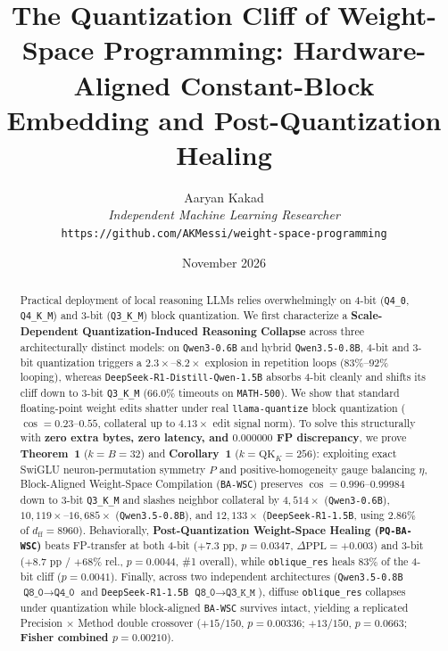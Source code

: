 \documentclass[11pt,letterpaper]{article}
\title{\textbf{The Quantization Cliff of Weight-Space Programming: Hardware-Aligned Constant-Block Embedding and Post-Quantization Healing}}
\author{Aaryan Kakad\\
\textit{Independent Machine Learning Researcher}\\
\texttt{https://github.com/AKMessi/weight-space-programming}}
\date{November 2026}
\begin{document}
\maketitle

\begin{abstract}
Practical deployment of local reasoning LLMs relies overwhelmingly on 4-bit (\texttt{Q4\_0}, \texttt{Q4\_K\_M}) and 3-bit (\texttt{Q3\_K\_M}) block quantization. We first characterize a \textbf{Scale-Dependent Quantization-Induced Reasoning Collapse} across three architecturally distinct models: on \texttt{Qwen3-0.6B} and hybrid \texttt{Qwen3.5-0.8B}, 4-bit and 3-bit quantization triggers a $2.3\times$--$8.2\times$ explosion in repetition loops ($83\%$--$92\%$ looping), whereas \texttt{DeepSeek-R1-Distill-Qwen-1.5B} absorbs 4-bit cleanly and shifts its cliff down to 3-bit \texttt{Q3\_K\_M} ($66.0\%$ timeouts on \texttt{MATH-500}). We show that standard floating-point weight edits shatter under real \texttt{llama-quantize} block quantization ($\cos = 0.23\text{--}0.55$, collateral up to $4.13\times$ edit signal norm). To solve this structurally with \textbf{zero extra bytes, zero latency, and $0.000000$ FP discrepancy}, we prove \textbf{Theorem~1} ($k=B=32$) and \textbf{Corollary~1} ($k=\mathrm{QK}_K=256$): exploiting exact SwiGLU neuron-permutation symmetry $P$ and positive-homogeneity gauge balancing $\eta$, Block-Aligned Weight-Space Compilation (\texttt{BA-WSC}) preserves $\cos = 0.996\text{--}0.99984$ down to 3-bit \texttt{Q3\_K\_M} and slashes neighbor collateral by $4{,}514\times$ (\texttt{Qwen3-0.6B}), $10{,}119\times\text{--}16{,}685\times$ (\texttt{Qwen3.5-0.8B}), and $12{,}133\times$ (\texttt{DeepSeek-R1-1.5B}, using $2.86\%$ of $d_{\text{ff}}=8960$). Behaviorally, \textbf{Post-Quantization Weight-Space Healing (\texttt{PQ-BA-WSC})} beats FP-transfer at both 4-bit ($+7.3\text{ pp}$, $p=0.0347$, $\Delta\text{PPL}=+0.003$) and 3-bit ($+8.7\text{ pp}$ / $+68\%$ rel., $p=0.0044$, \#1 overall), while \texttt{oblique\_res} heals $83\%$ of the 4-bit cliff ($p=0.0041$). Finally, across two independent architectures (\texttt{Qwen3.5-0.8B} $\texttt{Q8\_0}\to\texttt{Q4\_0}$ and \texttt{DeepSeek-R1-1.5B} $\texttt{Q8\_0}\to\texttt{Q3\_K\_M}$), diffuse \texttt{oblique\_res} collapses under quantization while block-aligned \texttt{BA-WSC} survives intact, yielding a replicated Precision $\times$ Method double crossover ($+15/150$, $p=0.00336$; $+13/150$, $p=0.0663$; \textbf{Fisher combined $p=0.00210$}).
\end{abstract}
\end{document}
